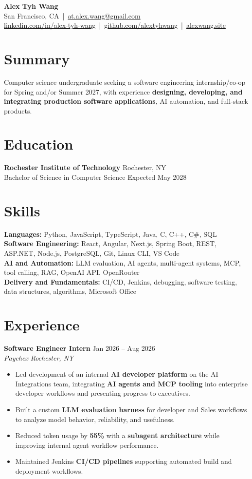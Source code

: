 \documentclass[10pt,letterpaper]{article}
\newif\ifresumeFirstRole
\newcommand{\resumeRole}[4]{%
  \ifresumeFirstRole
    \global\resumeFirstRolefalse
  \else
    \vspace{0pt plus 1fill}%
  \fi
  \textbf{#1} \hfill #2\\
  \textit{#3} \hfill \textit{#4}
}
\begin{document}
\begin{center}
{\Large \textbf{Alex Tyh Wang}}\\
San Francisco, CA \,|\, \href{mailto:at.alex.wang@gmail.com}{at.alex.wang@gmail.com}\\
\small \href{https://www.linkedin.com/in/alex-tyh-wang/}{linkedin.com/in/alex-tyh-wang} \,|\, \href{https://github.com/alextyhwang}{github.com/alextyhwang} \,|\, \href{https://alexwang.site}{alexwang.site}
\end{center}

\section*{Summary}
Computer science undergraduate seeking a software engineering internship/co-op for Spring and/or Summer 2027, with experience \textbf{designing, developing, and integrating production software applications}, AI automation, and full-stack products.

\section*{Education}
\textbf{Rochester Institute of Technology} \hfill Rochester, NY\\
Bachelor of Science in Computer Science \hfill Expected May 2028

\section*{Skills}
\textbf{Languages:} Python, JavaScript, TypeScript, Java, C, C++, C\#, SQL\\
\textbf{Software Engineering:} React, Angular, Next.js, Spring Boot, REST, ASP.NET, Node.js, PostgreSQL, Git, Linux CLI, VS Code\\
\textbf{AI and Automation:} LLM evaluation, AI agents, multi-agent systems, MCP, tool calling, RAG, OpenAI API, OpenRouter\\
\textbf{Delivery and Fundamentals:} CI/CD, Jenkins, debugging, software testing, data structures, algorithms, Microsoft Office

\section*{Experience}
\resumeRole{Software Engineer Intern}{Jan 2026 -- Aug 2026}{Paychex}{Rochester, NY}
\begin{itemize}
  \item Led development of an internal \textbf{AI developer platform} on the AI Integrations team, integrating \textbf{AI agents and MCP tooling} into enterprise developer workflows and presenting progress to executives.
  \item Built a custom \textbf{LLM evaluation harness} for developer and Sales workflows to analyze model behavior, reliability, and usefulness.
  \item Reduced token usage by \textbf{55\%} with a \textbf{subagent architecture} while improving internal agent workflow performance.
  \item Maintained Jenkins \textbf{CI/CD pipelines} supporting automated build and deployment workflows.
\end{itemize}
\end{document}
